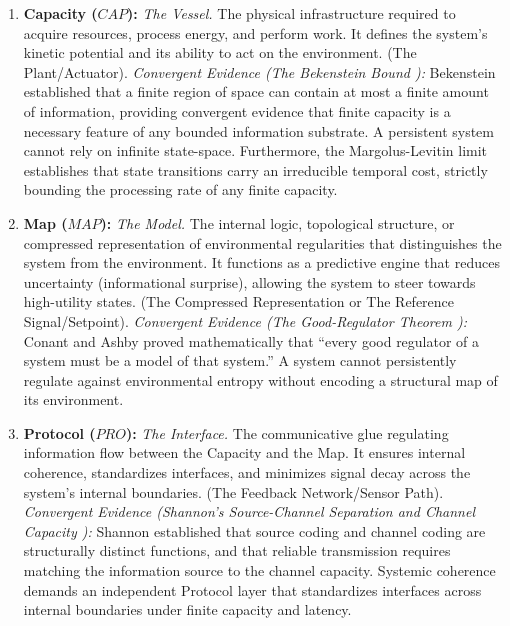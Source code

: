 \begin{enumerate}
    \item \textbf{Capacity ($CAP$):} \textit{The Vessel.} 
    The physical infrastructure required to acquire resources, process energy, and perform work. It defines the system's kinetic potential and its ability to act on the environment. (The Plant/Actuator). 
    \textit{Convergent Evidence (The Bekenstein Bound \cite{bekenstein_universal_1981}):} 
    Bekenstein established that a finite region of space can contain at most a finite amount of information, providing convergent evidence that finite capacity is a necessary feature of any bounded information substrate. A persistent system cannot rely on infinite state-space. Furthermore, the Margolus-Levitin limit \cite{margolus_maximum_1998} establishes that state transitions carry an irreducible temporal cost, strictly bounding the processing rate of any finite capacity.

    \item \textbf{Map ($MAP$):} \textit{The Model.}
    The internal logic, topological structure, or compressed representation of environmental regularities that distinguishes the system from the environment. It functions as a predictive engine that reduces uncertainty (informational surprise), allowing the system to steer towards high-utility states. (The Compressed Representation or The Reference Signal/Setpoint). 
    \textit{Convergent Evidence (The Good-Regulator Theorem \cite{conant_every_1970}):} Conant and Ashby proved mathematically that ``every good regulator of a system must be a model of that system.'' A system cannot persistently regulate against environmental entropy without encoding a structural map of its environment.

    \item \textbf{Protocol ($PRO$):} \textit{The Interface.}
    The communicative glue regulating information flow between the Capacity and the Map. It ensures internal coherence, standardizes interfaces, and minimizes signal decay across the system's internal boundaries. (The Feedback Network/Sensor Path). 
    \textit{Convergent Evidence (Shannon's Source-Channel Separation and Channel Capacity \cite{shannon_communication_1949}):} Shannon established that source coding and channel coding are structurally distinct functions, and that reliable transmission requires matching the information source to the channel capacity. Systemic coherence demands an independent Protocol layer that standardizes interfaces across internal boundaries under finite capacity and latency.
    

\end{enumerate}
